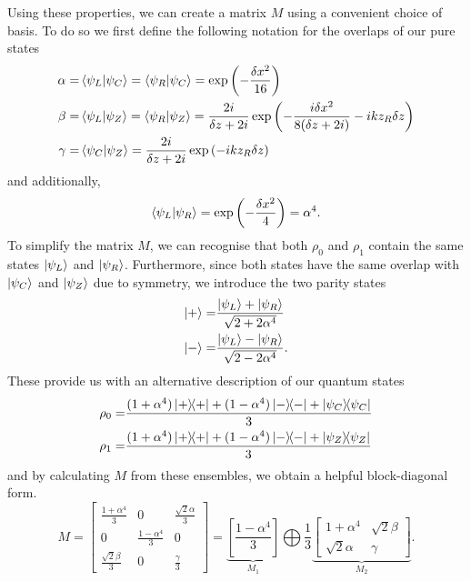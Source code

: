 \documentclass[reprint,amsmath,amssymb,aps,prl,floatfix,groupedaddress,superscriptaddress]{revtex4-2}
\begin{document}
Using these properties, we can create a matrix $M$ using a convenient choice of basis. To do so we first define the following notation for the overlaps of our pure states
\begin{equation}
\begin{aligned}
\alpha =& \braket{\psi_L}{\psi_C} = \braket{\psi_R}{\psi_C} = \exp \left(-\frac{\delta x^2}{16} \right) \\
\beta =& \braket{\psi_L}{\psi_Z} = \braket{\psi_R}{\psi_Z} = \frac{2i}{\delta z + 2i} \exp \left(-\frac{i \delta x^2}{8(\delta z + 2i)} - i k z_R \delta z \right) \\
\gamma =& \braket{\psi_C}{\psi_Z} = \frac{2i}{\delta z + 2i} \exp \left( -i k z_R \delta z \right)
\end{aligned}
\end{equation}
and additionally,
\begin{equation}
\braket{\psi_L}{\psi_R} = \exp \left(-\frac{\delta x^2}{4} \right) = \alpha^4.
\end{equation}
To simplify the matrix $M$, we can recognise that both $\rho_0$ and $\rho_1$ contain the same states $\ket{\psi_L}$ and $\ket{\psi_R}$. Furthermore, since both states have the same overlap with $\ket{\psi_C}$ and $\ket{\psi_Z}$ due to symmetry, we introduce the two parity states
\begin{equation}
\begin{aligned}
\ket{+} =&\frac{\ket{\psi_L} + \ket{\psi_R}}{\sqrt{2 + 2\alpha^4}} \\
\ket{-} =& \frac{\ket{\psi_L} - \ket{\psi_R}}{\sqrt{2 - 2\alpha^4}}.
\end{aligned}
\end{equation}
These provide us with an alternative description of our quantum states
\begin{equation}
\begin{aligned}
\rho_0 =& \frac{(1+\alpha^4)\ketbra{+}{+} + (1-\alpha^4)\ketbra{-}{-} + \ketbra{\psi_C}{\psi_C}}{3} \\
\rho_1 =& \frac{(1+\alpha^4)\ketbra{+}{+} + (1-\alpha^4)\ketbra{-}{-} + \ketbra{\psi_Z}{\psi_Z}}{3}
\end{aligned}
\end{equation}
and by calculating $M$ from these ensembles, we obtain a helpful block-diagonal form.
\begin{equation}
M = \begin{bmatrix}
\frac{1+\alpha^4}{3} & 0 & \frac{\sqrt{2} \alpha}{3} \\
0 & \frac{1 - \alpha^4}{3} & 0 \\
\frac{\sqrt{2} \beta}{3} & 0 & \frac{\gamma}{3}
\end{bmatrix}
= \underbrace{\left[ \frac{1-\alpha^4}{3} \right]}_{M_1} \bigoplus \frac{1}{3} \underbrace{\begin{bmatrix} 1+\alpha^4 & \sqrt{2}\beta \\ \sqrt{2}\alpha & \gamma \end{bmatrix}}_{M_2}.
\end{equation}
\end{document}
